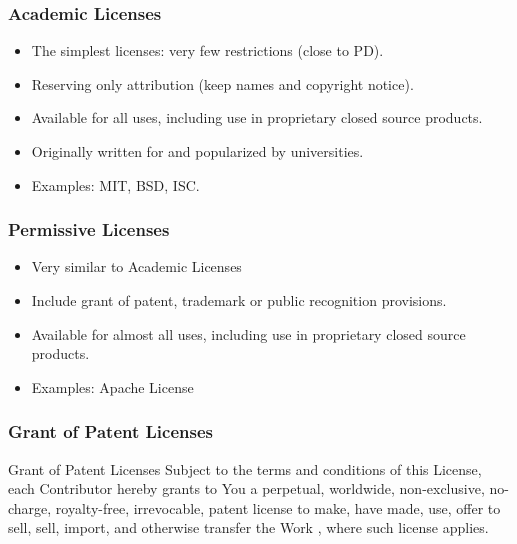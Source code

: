 
\begin{frame}
\frametitle{Academic Licenses}

\begin{itemize}
\item The simplest licenses: very few restrictions (close to PD).
\item Reserving only attribution (keep names and copyright notice).
\item Available for all uses, including use in proprietary closed source products.
\item Originally written for and popularized by universities.
\item Examples: MIT, BSD, ISC.
\end{itemize}

\end{frame}


\begin{frame}
\frametitle{Permissive Licenses}

\begin{itemize}
\item Very similar to Academic Licenses
\item Include grant of patent, trademark or public recognition provisions.
\item Available for almost all uses, including use in proprietary closed source products.
\item Examples: Apache License 
\end{itemize}

\end{frame}


\begin{frame}
\frametitle{Grant of Patent Licenses}

\begin{block}{Grant of Patent Licenses}
Subject to the terms and conditions of this License, each Contributor hereby grants to You a perpetual, worldwide, non-exclusive, no-charge, royalty-free, irrevocable, patent license to make, have made, use, offer to sell, sell, import, and otherwise transfer the Work , where such license applies.
\end{block}

\end{frame}

